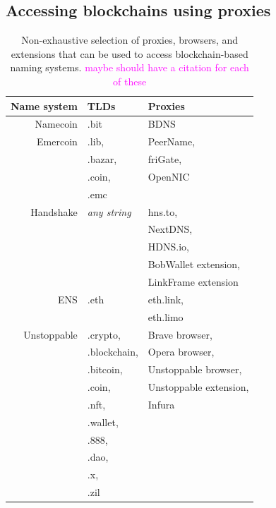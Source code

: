\documentclass[10pt,sigconf,letterpaper]{acmart}
\newcommand{\randall}{\ding{110}\ding{43}\textcolor{magenta}}
\newcommand{\randall}{}
\begin{document}



\subsection{Accessing blockchains using proxies}

\begin{table}
	\begin{tabular}{r l l}
		\toprule
		Name system & TLDs & Proxies \\
		\midrule
		Namecoin & .bit & BDNS \\
		Emercoin & .lib, & PeerName,  \\
		& .bazar, & friGate, \\
		& .coin, & OpenNIC \\
		& .emc & \\
		Handshake & \emph{any string} & hns.to, \\
		& & NextDNS, \\
		& & HDNS.io,\\
		& & BobWallet extension, \\
		& & LinkFrame extension \\
		ENS & .eth & eth.link, \\
		& & eth.limo \\
		Unstoppable & .crypto, & Brave browser, \\
		& .blockchain, & Opera browser, \\
		& .bitcoin, & Unstoppable browser, \\
		& .coin, & Unstoppable extension, \\
		& .nft, & Infura\\
		& .wallet, & \\
		& .888, & \\
		& .dao, & \\
		& .x, & \\
		& .zil & \\
		\bottomrule
	\end{tabular}
	\caption{Non-exhaustive selection of proxies, browsers, 
	and extensions 
	that can be used to access blockchain-based naming 
	systems. \randall{maybe should have a citation for each 
	of these}}
	\label{tab:proxies_and_tlds}
\end{table}
\end{document}
